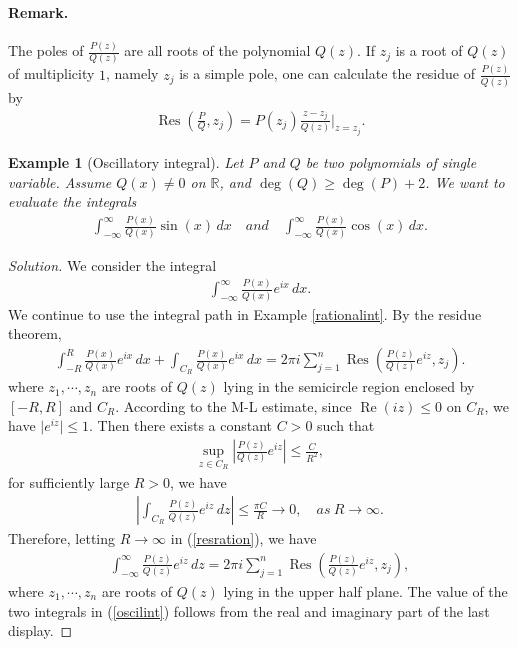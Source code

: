 \documentclass{article}
\numberwithin{equation}{section}
\newcommand{\bbR}{\mathbb{R}}
\DeclareMathOperator{\re}{Re}
\DeclareMathOperator{\res}{Res}
\theoremstyle{plain}
\newtheorem{example}[theorem]{Example}
\theoremstyle{definition}
\begin{document}
\paragraph{Remark.} The poles of $\frac{P(z)}{Q(z)}$ are all roots of the polynomial $Q(z)$. If $z_j$ is a root of $Q(z)$ of multiplicity $1$, namely $z_j$ is a simple pole, one can calculate the residue of $\frac{P(z)}{Q(z)}$ by
\begin{align*}
	\res\left(\frac{P}{Q},z_j\right)=P(z_j)\frac{z-z_j}{Q(z)}\bigg|_{z=z_j}.
\end{align*}

\begin{example}[Oscillatory integral]
Let $P$ and $Q$ be two polynomials of single variable. Assume $Q(x)\neq 0$ on $\bbR$, and $\deg(Q)\geq\deg(P)+2$. We want to evaluate the integrals
\begin{align}\label{oscilint}
	\int_{-\infty}^\infty \frac{P(x)}{Q(x)}\sin(x)\,dx\quad and\quad \int_{-\infty}^\infty \frac{P(x)}{Q(x)}\cos(x)\,dx.
\end{align}
\end{example}
\begin{proof}[Solution]
We consider the integral
\begin{align*}
	\int_{-\infty}^\infty \frac{P(x)}{Q(x)}e^{i x}\,dx.
\end{align*}
We continue to use the integral path in Example \ref{rationalint}. By the residue theorem,
\begin{align*}
	\int_{-R}^R\frac{P(x)}{Q(x)}e^{i x}\,dx+\int_{C_R}\frac{P(x)}{Q(x)}e^{i x}\,dx=2\pi i\sum_{j=1}^n\res\left(\frac{P(z)}{Q(z)}e^{i z},z_j\right).
\end{align*}
where $z_1,\cdots,z_n$ are roots of $Q(z)$ lying in the semicircle region enclosed by $[-R,R]$ and $C_R$. According to the M-L estimate, since $\re(i z)\leq 0$ on $C_R$, we have $\vert e^{i z}\vert\leq 1$. Then there exists a constant $C>0$ such that
\begin{align*}
	\sup_{z\in C_R}\left\vert\frac{P(z)}{Q(z)}e^{i z}\right\vert\leq\frac{C}{R^2},
\end{align*}
for sufficiently large $R>0$, we have
\begin{align*}
	\left\vert\int_{C_R}\frac{P(z)}{Q(z)}e^{i z}\,dz\right\vert\leq\frac{\pi C}{R}\to 0,\quad as\ R\to\infty.
\end{align*}
Therefore, letting $R\to\infty$ in (\ref{resration}), we have
\begin{align*}
	\int_{-\infty}^\infty\frac{P(z)}{Q(z)}e^{i z}\,dz=2\pi i\sum_{j=1}^n\res\left(\frac{P(z)}{Q(z)}e^{i z},z_j\right),
\end{align*}
where $z_1,\cdots,z_n$ are roots of $Q(z)$ lying in the upper half plane. The value of the two integrals in (\ref{oscilint}) follows from the real and imaginary part of the last display.
\end{proof}
\end{document}
